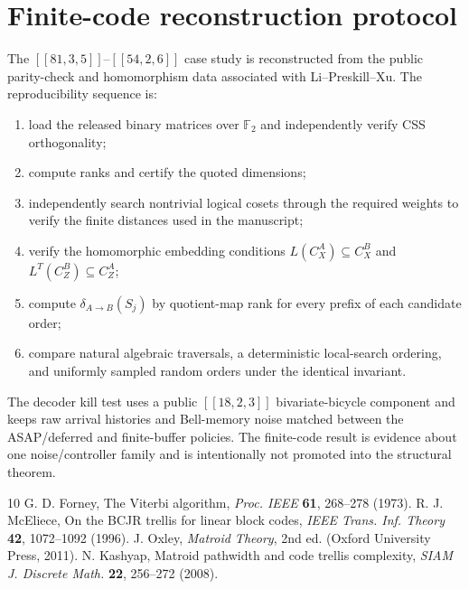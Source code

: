 \documentclass[aps,prx,preprint,superscriptaddress,nofootinbib,longbibliography]{revtex4-2}
\newcommand{\F}{\mathbb F_2}\newcommand{\E}{\mathbb E}\newcommand{\codim}{\operatorname{codim}}
\begin{document}
\section{Finite-code reconstruction protocol}
The $[[81,3,5]]$--$[[54,2,6]]$ case study is reconstructed from the public parity-check and homomorphism data associated with Li--Preskill--Xu. The reproducibility sequence is:
\begin{enumerate}
\item load the released binary matrices over $\F$ and independently verify CSS orthogonality;
\item compute ranks and certify the quoted dimensions;
\item independently search nontrivial logical cosets through the required weights to verify the finite distances used in the manuscript;
\item verify the homomorphic embedding conditions $L(C_X^A)\subseteq C_X^B$ and $L^T(C_Z^B)\subseteq C_Z^A$;
\item compute $\delta_{A\to B}(S_j)$ by quotient-map rank for every prefix of each candidate order;
\item compare natural algebraic traversals, a deterministic local-search ordering, and uniformly sampled random orders under the identical invariant.
\end{enumerate}
The decoder kill test uses a public $[[18,2,3]]$ bivariate-bicycle component and keeps raw arrival histories and Bell-memory noise matched between the ASAP/deferred and finite-buffer policies. The finite-code result is evidence about one noise/controller family and is intentionally not promoted into the structural theorem.

\begin{thebibliography}{10}
 G. D. Forney, The Viterbi algorithm, \emph{Proc. IEEE} \textbf{61}, 268--278 (1973).
 R. J. McEliece, On the BCJR trellis for linear block codes, \emph{IEEE Trans. Inf. Theory} \textbf{42}, 1072--1092 (1996).
 J. Oxley, \emph{Matroid Theory}, 2nd ed. (Oxford University Press, 2011).
 N. Kashyap, Matroid pathwidth and code trellis complexity, \emph{SIAM J. Discrete Math.} \textbf{22}, 256--272 (2008).
\end{thebibliography}
\end{document}
